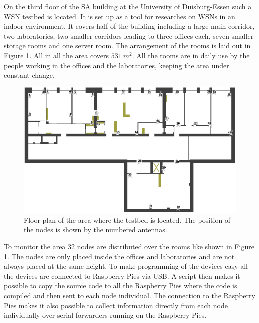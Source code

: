 On the third floor of the SA building at the University of Duisburg-Essen such a WSN testbed is located. It is set up as a tool for researches on WSNs in an indoor environment. It covers half of the building including a large main corridor, two laboratories, two smaller corridors leading to three offices each, seven smaller storage rooms and one server room. The arrangement of the rooms is laid out in Figure \ref{fig:testbed}. All in all the area covers $531\ m^2$. All the rooms are in daily use by the people working in the offices and the laboratories, keeping the area under constant change.

\begin{figure}[htbp]
	\centering
    \includegraphics[scale=0.75]{content/images/Testbed}
   	\caption{Floor plan of the area where the testbed is located. The position of the nodes is shown by the numbered antennas.}
    \label{fig:testbed}
\end{figure}

To monitor the area 32 nodes are distributed over the rooms like shown in Figure \ref{fig:testbed}. The nodes are only placed inside the offices and laboratories and are not always placed at the same height. To make programming of the devices easy all the devices are connected to Raspberry Pies via USB. A script then makes it possible to copy the source code to all the Raspberry Pies where the code is compiled and then sent to each node individual. The connection to the Raspberry Pies makes it also possible to collect information directly from each node individually over serial forwarders running on the Raspberry Pies.

